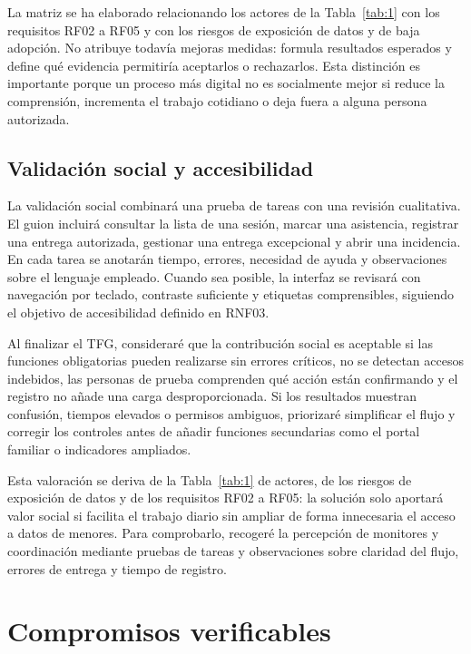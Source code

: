 La matriz se ha elaborado relacionando los actores de la Tabla~\ref{tab:1} con los requisitos RF02 a RF05 y con los riesgos de exposición de datos y de baja adopción. No atribuye todavía mejoras medidas: formula resultados esperados y define qué evidencia permitiría aceptarlos o rechazarlos. Esta distinción es importante porque un proceso más digital no es socialmente mejor si reduce la comprensión, incrementa el trabajo cotidiano o deja fuera a alguna persona autorizada.

\subsection{Validación social y accesibilidad}\label{sec:5-5-2}

La validación social combinará una prueba de tareas con una revisión cualitativa. El guion incluirá consultar la lista de una sesión, marcar una asistencia, registrar una entrega autorizada, gestionar una entrega excepcional y abrir una incidencia. En cada tarea se anotarán tiempo, errores, necesidad de ayuda y observaciones sobre el lenguaje empleado. Cuando sea posible, la interfaz se revisará con navegación por teclado, contraste suficiente y etiquetas comprensibles, siguiendo el objetivo de accesibilidad definido en RNF03.

Al finalizar el TFG, consideraré que la contribución social es aceptable si las funciones obligatorias pueden realizarse sin errores críticos, no se detectan accesos indebidos, las personas de prueba comprenden qué acción están confirmando y el registro no añade una carga desproporcionada. Si los resultados muestran confusión, tiempos elevados o permisos ambiguos, priorizaré simplificar el flujo y corregir los controles antes de añadir funciones secundarias como el portal familiar o indicadores ampliados.

Esta valoración se deriva de la Tabla~\ref{tab:1} de actores, de los riesgos de exposición de datos y de los requisitos RF02 a RF05: la solución solo aportará valor social si facilita el trabajo diario sin ampliar de forma innecesaria el acceso a datos de menores. Para comprobarlo, recogeré la percepción de monitores y coordinación mediante pruebas de tareas y observaciones sobre claridad del flujo, errores de entrega y tiempo de registro.

\section{Compromisos verificables}\label{sec:5-6}

